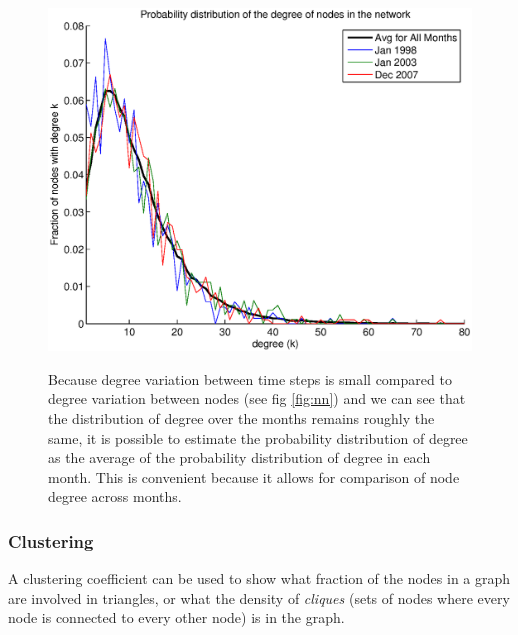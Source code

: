 \documentclass[12pt]{article}
\begin{document}
\begin{figure}[H]
\includegraphics[trim = 0cm 0cm 0cm 0cm, width = .9\textwidth]{Graficos/ProbDistk.eps}
\label{fig:ProbDistk}
\caption{Because degree variation between time steps is small compared to degree variation between nodes (see fig \ref{fig:nn}) and we can see that the distribution of degree over the months remains roughly the same, it is possible to estimate the probability distribution of degree as the average of the probability distribution of degree in each month. This is convenient because it allows for comparison of node degree across months.}
\label{fig:Pk}
\end{figure}

\subsubsection*{Clustering}

A clustering coefficient can be used to show what fraction of the nodes in a graph are involved in triangles, or what the density of \emph{cliques} (sets of nodes where every node is connected to every other node) is in the graph.
\end{document}
